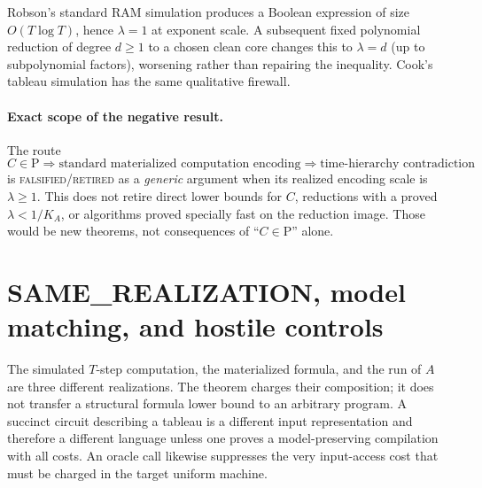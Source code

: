 \documentclass[11pt]{article}
\newcommand{\RET}{\textsc{falsified/retired}}
\begin{document}
Robson's standard RAM simulation produces a Boolean expression of size
$O(T\log T)$, hence $\lambda=1$ at exponent scale.  A subsequent fixed polynomial
reduction of degree $d\ge1$ to a chosen clean core changes this to
$\lambda=d$ (up to subpolynomial factors), worsening rather than repairing the
inequality.  Cook's tableau simulation has the same qualitative firewall.

\paragraph{Exact scope of the negative result.}
The route
\[
  C\in\mathrm P
  \Longrightarrow \text{standard materialized computation encoding}
  \Longrightarrow \text{time-hierarchy contradiction}
\]
is \RET{} as a \emph{generic} argument when its realized encoding scale is
$\lambda\ge1$.  This does not retire direct lower bounds for $C$, reductions with
a proved $\lambda<1/K_A$, or algorithms proved specially fast on the reduction
image.  Those would be new theorems, not consequences of ``$C\in\mathrm P$'' alone.

\section{SAME\_REALIZATION, model matching, and hostile controls}
The simulated $T$-step computation, the materialized formula, and the run of $A$
are three different realizations.  The theorem charges their composition; it does
not transfer a structural formula lower bound to an arbitrary program.  A succinct
circuit describing a tableau is a different input representation and therefore a
different language unless one proves a model-preserving compilation with all
costs.  An oracle call likewise suppresses the very input-access cost that must be
charged in the target uniform machine.
\end{document}
